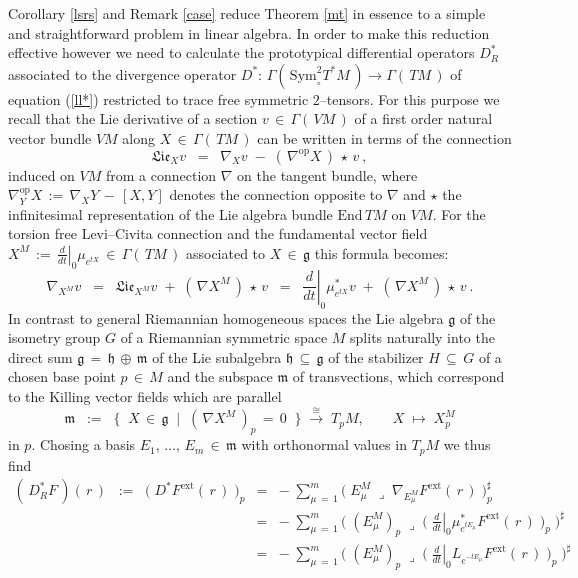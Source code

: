 \documentclass[12pt]{article}
\def\#{\sharp}
\def\End{\mathrm{End}}
\def\ext{\mathrm{ext}}
\def\g{\mathfrak{g}}
\def\h{\mathfrak{h}}
\def\ins{\lrcorner}
\def\m{\mathfrak{m}}
\def\S{\mathrm{Sym}}
\begin{document}
 \noindent
 Corollary \ref{lsrs} and Remark \ref{case} reduce Theorem \ref{mt} in
 essence to a simple and straightforward problem in linear algebra. In order
 to make this reduction effective however we need to calculate the prototypical
 differential operators $D^*_R$ associated to the divergence operator
 $D^*:\,\Gamma(\,\S^2_\circ T^*M\,)\longrightarrow\Gamma(\,TM\,)$ of
 equation (\ref{ll*}) restricted to trace free symmetric $2$--tensors.
 For this purpose we recall that the Lie derivative of a section
 $v\,\in\,\Gamma(\,VM\,)$ of a first order natural vector bundle $VM$
 along $X\,\in\,\Gamma(\,TM\,)$ can be written in terms of the connection
 $$
  \mathfrak{Lie}_Xv
  \;\;=\;\;
  \nabla_Xv\;-\;(\,\nabla^{\mathrm{op}}X\,)\,\star\,v\ ,
 $$
 induced on $VM$ from a connection $\nabla$ on the tangent bundle, where
 $\nabla^{\mathrm{op}}_YX\,:=\,\nabla_XY\,-\,[X,Y]$ denotes the connection
 opposite to $\nabla$ and $\star$ the infinitesimal representation of the
 Lie algebra bundle $\End\,TM$ on $VM$. For the torsion free Levi--Civita
 connection and the fundamental vector field $X^M\,:=\,\left.\frac d{dt}
 \right|_0\mu_{e^{tX}}\,\in\,\Gamma(\,TM\,)$ associated to $X\,\in\,\g$
 this formula becomes:
 \begin{equation}\label{nx}
  \nabla_{X^M}v
  \;\;=\;\;
  \mathfrak{Lie}_{X^M}v\;+\;(\,\nabla X^M\,)\,\star\,v
  \;\;=\;\;
  \left.\frac d{dt}\right|_0\mu_{e^{tX}}^*v
  \;+\;(\,\nabla X^M\,)\,\star\,v\ .
 \end{equation}
 In contrast to general Riemannian homogeneous spaces the Lie algebra
 $\g$ of the isometry group $G$ of a Riemannian symmetric space $M$
 splits naturally into the direct sum $\g\,=\,\h\,\oplus\,\m$ of the
 Lie subalgebra $\h\,\subseteq\,\g$ of the stabilizer $H\,\subseteq\,G$
 of a chosen base point $p\,\in\,M$ and the subspace $\m$ of transvections,
 which correspond to the Killing vector fields which are parallel
 $$
  \m
  \;\;:=\;\;
  \{\;\;X\,\in\,\g\;\;|\;\;(\,\nabla X^M\,)_p\,=\,0\;\;\}
  \;\stackrel\cong\longrightarrow\;T_pM,\qquad X\;\longmapsto\;X^M_p
 $$
 in $p$. Chosing a basis $E_1,\,\ldots,\,E_m\,\in\,\m$ with orthonormal values
 in $T_pM$ we thus find
 \begin{eqnarray*}
  (\,D_R^*F\,)(\,r\,)
  \;\;:=\;\;
  \Big(\;D^*F^\ext(\,r\,)\;\Big)_p
  &=&
  -\;\sum_{\mu\,=\,1}^m\Big(\;E^M_\mu\;\ins\;
  \nabla_{E^M_\mu}F^\ext(\,r\,)\;\Big)^\#_p
  \\
  &=&
  -\;\sum_{\mu\,=\,1}^m\Big(\;(E^M_\mu)^{\;}_p\;\ins\;
  \Big(\;\left.\frac d{dt}\right|_0\mu^*_{e^{tE_\mu}}F^\ext(\,r\,)
  \;\Big)_p\;\Big)^\#
  \\
  &=&
  -\;\sum_{\mu\,=\,1}^m\Big(\;(E^M_\mu)^{\;}_p\;\ins\;
  \Big(\;\left.\frac d{dt}\right|_0L_{e^{-tE_\mu}}F^\ext(\,r\,)
  \;\Big)_p\;\Big)^\#
 \end{eqnarray*}
\end{document}
